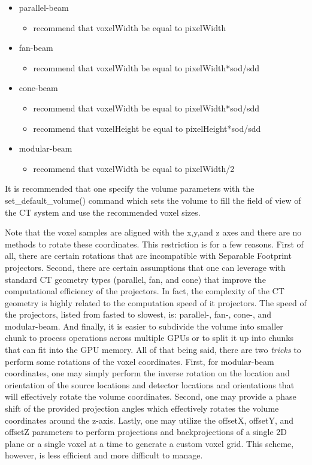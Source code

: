 \documentclass[11pt]{article}
\begin{document}
\begin{itemize}
\item parallel-beam
    \begin{itemize}
    \item recommend that voxelWidth be equal to pixelWidth
    \end{itemize}
\item fan-beam
    \begin{itemize}
    \item recommend that voxelWidth be equal to pixelWidth*sod/sdd
    \end{itemize}
\item cone-beam
    \begin{itemize}
    \item recommend that voxelWidth be equal to pixelWidth*sod/sdd
    \item recommend that voxelHeight be equal to pixelHeight*sod/sdd
    \end{itemize}
\item modular-beam
    \begin{itemize}
    \item recommend that voxelWidth be equal to pixelWidth/2
    \end{itemize}
\end{itemize}

It is recommended that one specify the volume parameters with the set\_default\_volume() command which sets the volume to fill the field of view of the CT system and use the recommended voxel sizes.

Note that the voxel samples are aligned with the x,y,and z axes and there are no methods to rotate these coordinates.  This restriction is for a few reasons.  First of all, there are certain rotations that are incompatible with Separable Footprint projectors.  Second, there are certain assumptions that one can leverage with standard CT geometry types (parallel, fan, and cone) that improve the computational efficiency of the projectors.  In fact, the complexity of the CT geometry is highly related to the computation speed of it projectors.  The speed of the projectors, listed from fasted to slowest, is: parallel-, fan-, cone-, and modular-beam.  And finally, it is easier to subdivide the volume into smaller chunk to process operations across multiple GPUs or to split it up into chunks that can fit into the GPU memory.  All of that being said, there are two \textit{tricks} to perform some rotations of the voxel coordinates.  First, for modular-beam coordinates, one may simply perform the inverse rotation on the location and orientation of the source locations and detector locations and orientations that will effectively rotate the volume coordinates.  Second, one may provide a phase shift of the provided projection angles which effectively rotates the volume coordinates around the z-axis.  Lastly, one may utilize the offsetX, offsetY, and offsetZ parameters to perform projections and backprojections of a single 2D plane or a single voxel at a time to generate a custom voxel grid.  This scheme, however, is less efficient and more difficult to manage.
\end{document}
